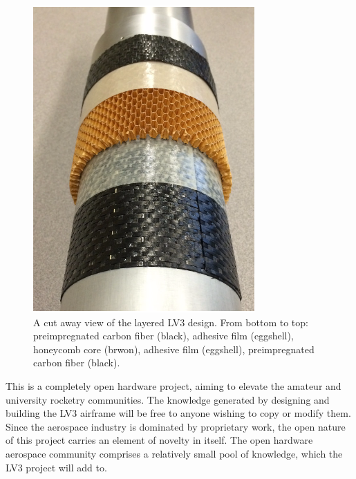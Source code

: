 \documentclass{aiaa-tc}%
\begin{document}
\begin{figure}
\centering
\includegraphics[width=\linewidth]{img/layers.png}
\caption{A cut away view of the layered LV3 design. From bottom to top: preimpregnated carbon fiber (black), adhesive film (eggshell), honeycomb core (brwon), adhesive film (eggshell), preimpregnated carbon fiber (black).}
\label{fig:layers}
\end{figure}

This is a completely open hardware project, aiming to elevate the amateur and university rocketry communities. The knowledge generated by designing and building the LV3 airframe will be free to anyone wishing to copy or modify them. 
Since the aerospace industry is dominated by proprietary work, the open nature of this project carries an element of novelty in itself. The open hardware aerospace community comprises a relatively small pool of knowledge, which the LV3 project will add to. 
\end{document}
